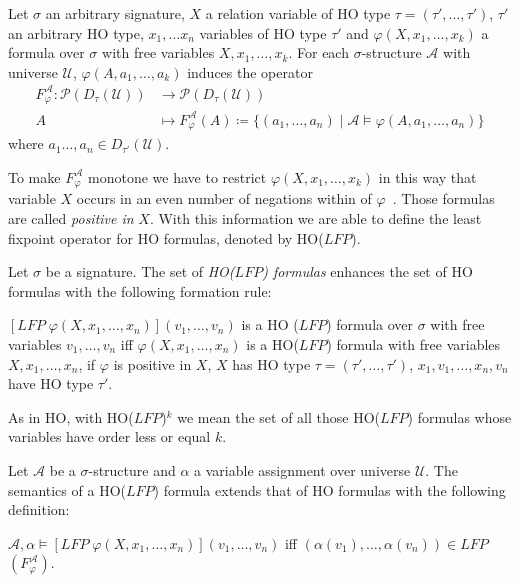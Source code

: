 \begin{definition}
    Let $\sigma$ an arbitrary signature, $X$ a relation variable of HO type $\tau = (\tau', \dots, \tau')$,
    $\tau'$ an arbitrary HO type, $x_1, \dots x_n$ variables of HO type $\tau'$ and $\varphi(X, x_1, \dots, x_k)$ a
    formula over $\sigma$ with free variables $X, x_1, \dots, x_k$. For each $\sigma$-structure $\mathcal{A}$ with
    universe $\mathcal{U}$, $\varphi(A, a_1, \dots, a_k)$ induces the operator
    \begin{align*}
        F_\varphi^\mathcal{A}\colon\mathscr{P}(D_\tau(\mathcal{U})) &\longrightarrow \mathscr{P}(D_\tau(\mathcal{U}))\\
        A &\longmapsto F_\varphi^\mathcal{A}(A) \coloneqq \{(a_1, \dots, a_n) \mid \mathcal{A} \models \varphi(A, a_1,
        \dots, a_n)\}
    \end{align*}
    where $a_1 \dots, a_n \in D_{\tau'}(\mathcal{U})$.
\end{definition}

To make $F_\varphi^\mathcal{A}$ monotone we have to restrict $\varphi(X, x_1, \dots, x_k)$ in this way that variable
$X$ occurs in an even number of negations within of $\varphi$~\cite{freireMartins2011descriptive}. Those formulas
are called \textit{positive in} $X$. With this information we are able to define the least fixpoint operator for HO
formulas, denoted by HO($\mathit{LFP}$).

\begin{definition}
    Let $\sigma$ be a signature. The set of \emph{HO($\mathit{LFP}$) formulas} enhances the set of HO formulas with the
    following formation rule:
    \begin{compactitem}
        \item $[\mathit{LFP}\;\varphi(X, x_1, \dots, x_n)](v_1, \dots, v_n)$ is a HO
        ($\mathit{LFP}$) formula over $\sigma$ with free variables $v_1, \dots, v_n$ iff $\varphi(X, x_1, \dots, x_n)
        $ is a HO($\mathit{LFP}$) formula with free variables $X, x_1, \dots, x_n$, if $\varphi$ is positive in
        $X$, $X$ has HO type $\tau = (\tau', \dots, \tau')$, $x_1, v_1, \dots, x_n, v_n$ have HO type $\tau'$.
    \end{compactitem}
\end{definition}

As in HO, with HO($\mathit{LFP}$)$^k$ we mean the set of all those HO($\mathit{LFP}$) formulas whose variables have
order less or equal $k$.

\begin{definition}
    Let $\mathcal{A}$ be a $\sigma$-structure and $\alpha$ a variable assignment over universe $\mathcal{U}$. The
    semantics of a HO($\mathit{LFP}$) formula extends that of HO formulas with the following definition:
    \begin{compactitem}
        \item $\mathcal{A}, \alpha \models [\mathit{LFP}\;\varphi(X, x_1, \dots, x_n)](v_1, \dots,
        v_n)$ iff $(\alpha(v_1), \dots, \alpha(v_n)) \in \mathit{LFP}$ $(F_\varphi^\mathcal{A})$.
    \end{compactitem}
\end{definition}

